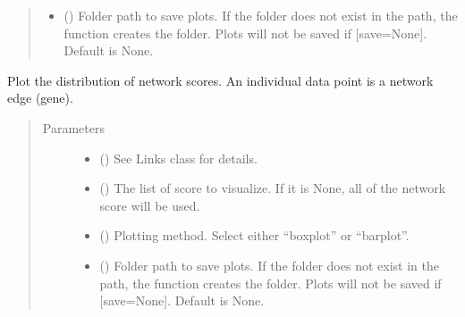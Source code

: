 \documentclass[letterpaper,10pt,english]{sphinxmanual}
\begin{document}
\begin{fulllineitems}
\begin{fulllineitems}
\begin{quote}
\begin{description}
\begin{itemize}
\item {} 
 () \textendash{} Folder path to save plots. If the folder does not exist in the path, the function creates the folder.
Plots will not be saved if {[}save=None{]}. Default is None.

\end{itemize}

\end{description}\end{quote}

\end{fulllineitems}


\begin{fulllineitems}
\label{\detokenize{modules/celloracle:celloracle.Links.plot_score_discributions}}
Plot the distribution of network scores.
An individual data point is a network edge (gene).
\begin{quote}\begin{description}
\item[{Parameters}] \leavevmode\begin{itemize}
\item {} 
 ({\hyperref[\detokenize{modules/celloracle:celloracle.Links}]{}}) \textendash{} See Links class for details.

\item {} 
 () \textendash{} The list of score to visualize. If it is None, all of the network score will be used.

\item {} 
 () \textendash{} Plotting method. Select either “boxplot” or “barplot”.

\item {} 
 () \textendash{} Folder path to save plots. If the folder does not exist in the path, the function creates the folder.
Plots will not be saved if {[}save=None{]}. Default is None.


\end{itemize}
\end{description}
\end{quote}
\end{fulllineitems}
\end{fulllineitems}
\end{document}
